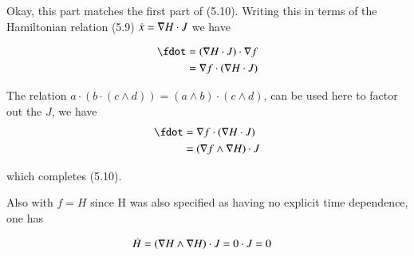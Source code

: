 Okay, this part matches the first part of (5.10).  Writing this in terms of the Hamiltonian relation (5.9) $\dot{x} = \nabla H \cdot J$ we have

\begin{align*}
\fdot
&= (\grad H \cdot J) \cdot \grad f \\
&= \grad f \cdot (\grad H \cdot J) \\
\end{align*}

The relation $a \cdot (b \cdot (c \wedge d)) = (a \wedge b) \cdot (c \wedge d)$, 
can be used here to factor out the $J$, we have
\begin{align*}
\fdot
&= \grad f \cdot (\grad H \cdot J) \\
&= (\grad f \wedge \grad H) \cdot J \\
\end{align*}

which completes (5.10).

Also with $f=H$ since H was also specified as having no explicit time dependence, one has

\begin{align*}
\dot{H} &= (\nabla H \wedge \nabla H) \cdot J = 0 \cdot J = 0
\end{align*}

%
%

%
